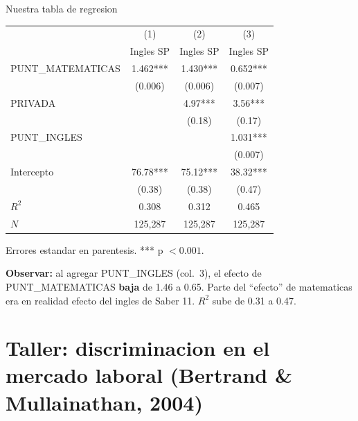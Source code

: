 \documentclass[aspectratio=169, 11pt]{beamer}
\begin{document}
\begin{frame}{Nuestra tabla de regresion}
\small
\begin{center}
\begin{tabular}{lccc}
\toprule
& (1) & (2) & (3) \\
& Ingles SP & Ingles SP & Ingles SP \\
\midrule
PUNT\_MATEMATICAS & 1.462*** & 1.430*** & 0.652*** \\
& (0.006) & (0.006) & (0.007) \\[4pt]
PRIVADA & & 4.97*** & 3.56*** \\
& & (0.18) & (0.17) \\[4pt]
PUNT\_INGLES & & & 1.031*** \\
& & & (0.007) \\[4pt]
Intercepto & 76.78*** & 75.12*** & 38.32*** \\
& (0.38) & (0.38) & (0.47) \\
\midrule
$R^2$ & 0.308 & 0.312 & 0.465 \\
$N$ & 125{,}287 & 125{,}287 & 125{,}287 \\
\bottomrule
\end{tabular}
\end{center}
\footnotesize Errores estandar en parentesis. *** p $< 0.001$.

\vspace{0.1cm}
\small \textbf{Observar:} al agregar PUNT\_INGLES (col.\ 3), el efecto de PUNT\_MATEMATICAS \textbf{baja} de 1.46 a 0.65. Parte del ``efecto'' de matematicas era en realidad efecto del ingles de Saber 11. $R^2$ sube de 0.31 a 0.47.
\end{frame}

\section{Taller: discriminacion en el mercado laboral (Bertrand \& Mullainathan, 2004)}
\end{document}
